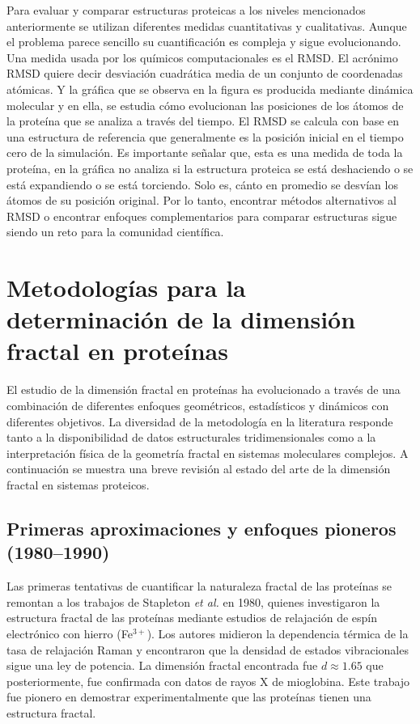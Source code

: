 Para evaluar y comparar estructuras proteicas a los niveles mencionados anteriormente se utilizan
diferentes medidas cuantitativas y cualitativas. Aunque el problema parece sencillo su cuantiﬁcaci\'{o}n es
compleja y sigue evolucionando. Una medida usada por los qu\'{i}micos computacionales es el RMSD. El acrónimo RMSD quiere decir desviación
cuadrática media de un conjunto de coordenadas atómicas. Y la gr\'{a}ﬁca que se observa en la figura 
es producida mediante dinámica molecular y en ella, se estudia cómo evolucionan las posiciones de los
átomos de la proteína que se analiza a través del tiempo. El RMSD se calcula con base en una estructura
de referencia que generalmente es la posición inicial en el tiempo cero de la simulación.
Es importante señalar que, esta es una medida de toda la proteína, en la gr\'{a}ﬁca no analiza si la estructura
proteica se está deshaciendo o se est\'{a} expandiendo o se está torciendo. Solo es, c\'{a}nto en promedio se desvían los \'{a}tomos de su posición original. Por lo tanto, encontrar
m\'{e}todos alternativos al RMSD o encontrar enfoques complementarios para comparar estructuras
sigue siendo un reto para la comunidad cient\'{i}ﬁca.


\color{blue}

\section{Metodologías para la determinación de la dimensión fractal en proteínas}

El estudio de la dimensión fractal en proteínas ha evolucionado a través de una combinación de diferentes enfoques geométricos, estadísticos y dinámicos con diferentes objetivos. La diversidad de la metodología en la literatura responde tanto a la disponibilidad de datos estructurales tridimensionales como a la interpretación física de la geometría fractal en sistemas moleculares complejos. A continuación se muestra una breve revisión al estado del arte de la dimensión fractal en sistemas proteicos.

\subsection{Primeras aproximaciones y enfoques pioneros (1980--1990)}

Las primeras tentativas de cuantificar la naturaleza fractal de las proteínas se remontan a los trabajos de Stapleton \textit{et al.}\cite{Stapleton1980} en 1980, quienes investigaron la estructura fractal de las proteínas mediante estudios de relajación de espín electrónico con hierro (Fe$^{3+}$). Los autores midieron la dependencia térmica de la tasa de relajación Raman y encontraron que la densidad de estados vibracionales sigue una ley de potencia. La dimensión fractal encontrada fue $d \approx 1.65$ que posteriormente, fue confirmada con datos de rayos X de mioglobina. Este trabajo fue pionero en demostrar experimentalmente que las proteínas tienen una estructura fractal. 

